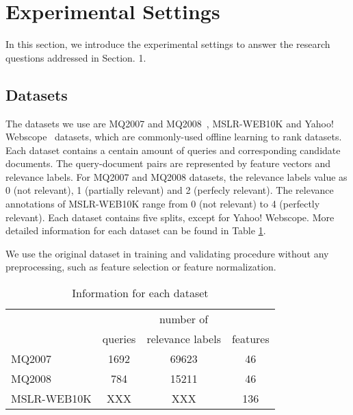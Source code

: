 \section{Experimental Settings}

In this section, we introduce the experimental settings to answer the research questions addressed in Section. 1.

\subsection{Datasets}
The datasets we use are MQ2007 and MQ2008~\cite{DBLP:journals/corr/QinL13}, MSLR-WEB10K\cite{DBLP:journals/corr/QinL13} and Yahoo! Webscope~\cite{DBLP:journals/jmlr/ChapelleC11} datasets, which are commonly-used offline learning to rank datasets. Each dataset contains a centain amount of queries and corresponding candidate documents. The query-document pairs are represented by feature vectors and relevance labels. For MQ2007 and MQ2008 datasets, the relevance labels value as 0 (not relevant), 1 (partially relevant) and 2 (perfecly relevant). The relevance annotations of MSLR-WEB10K range from 0 (not relevant) to 4 (perfectly relevant). Each dataset contains five splits, except for Yahoo! Webscope. More detailed information for each dataset can be found in Table \ref{table:1:dataset}.

We use the original dataset in training and validating procedure without any preprocessing, such as feature selection or feature normalization.

\begin{table}
	\caption{Information for each dataset}
	\label{table:1:dataset}
	\centering
	\begin{tabular}{l c c c}
		\hline
		& & number of & \\
		& queries&  relevance labels  & features \\
		\midrule
		MQ2007  &   1692  &    69623  &    46    \\
		MQ2008  &  784  &   15211  &    46    \\
		MSLR-WEB10K  &   XXX &   XXX  &    136  \\
		\hline
	\end{tabular}
\end{table}

